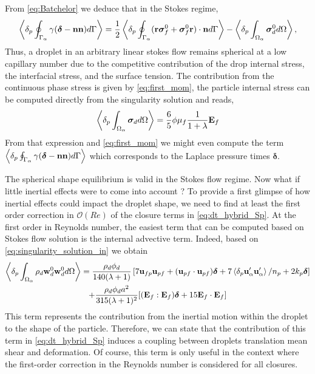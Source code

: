 
From  \ref{eq:Batchelor} we deduce that in the Stokes regime, 
\begin{equation*}
    \left<\delta_p \oint_{\Gamma_{\alpha}} \gamma(\bm\delta - \textbf{nn}) d\Gamma\right>
    = 
    \frac{1}{2}\left<\delta_p \oint_{\Gamma_{\alpha}} (\textbf{r}\bm\sigma_f^0+\bm\sigma_f^0\textbf{r})\cdot \textbf{n} d\Gamma\right>
    - \left<\delta_p \int_{\Omega_{\alpha}} \bm{\sigma}_d^0 d\Omega\right>,
\end{equation*}
Thus, a droplet in an arbitrary linear stokes flow remains spherical at a low capillary number due to the competitive contribution of the drop internal stress, the interfacial stress, and the surface tension.
The contribution from the continuous phase stress is given by \ref{eq:first_mom}, the particle internal stress can be computed directly from the singularity solution and reads, 
\begin{equation}
    \left<\delta_p \int_{\Omega_{\alpha}} \bm{\sigma}_d d\Omega\right>
    = \frac{6}{5}\phi \mu_f \frac{1}{1+\lambda} \textbf{E}_f
\end{equation}
From that expression and  \ref{eq:first_mom} we might even compute the term $ \left<\delta_p \oint_{\Gamma_{\alpha}} \gamma(\bm\delta - \textbf{nn}) d\Gamma\right>$ which corresponds to the Laplace pressure times $\bm\delta$. 

The spherical shape equilibrium is valid in the Stokes flow regime. 
Now what if little inertial effects were to come into account  ?
To provide a first glimpse of how inertial effects could impact the droplet shape, we need to find at least the first order correction in $\mathcal{O}(Re)$ of the closure terms in \ref{eq:dt_hybrid_Sp}. 
At the first order in Reynolds number, the easiest term that can be computed based on Stokes flow solution is the internal advective term. 
Indeed, based on \ref{eq:singularity_solution_in} we obtain
\begin{multline}
    \pOavg{\rho_d \textbf{w}_d^0  \textbf{w}_d^0 }
    = \frac{\rho_d \phi_d}{140(\lambda +1 )}
    \left[
        7\textbf{u}_{fp}\textbf{u}_{pf} 
    + (\textbf{u}_{pf}\cdot \textbf{u}_{pf})\bm\delta
    + 7\pavg{\textbf{u}_\alpha'\textbf{u}_\alpha'}/n_p 
    + 2k_p \bm\delta
    \right]\\
    + \frac{\rho_d \phi_d a^2}{315 (\lambda + 1)^2}[(\textbf{E}_f : \textbf{E}_f)\bm\delta+15\textbf{E}_f\cdot \textbf{E}_f]
    \label{eq:ww_closure}
\end{multline}
This term represents the contribution from the inertial motion within the droplet to the shape of the particle. 
Therefore, we can state that the contribution of this term in \ref{eq:dt_hybrid_Sp} induces a coupling between droplets translation mean shear and deformation. 
Of course, this term is only useful in the context where the first-order correction in the Reynolds number is considered for all closures. 

